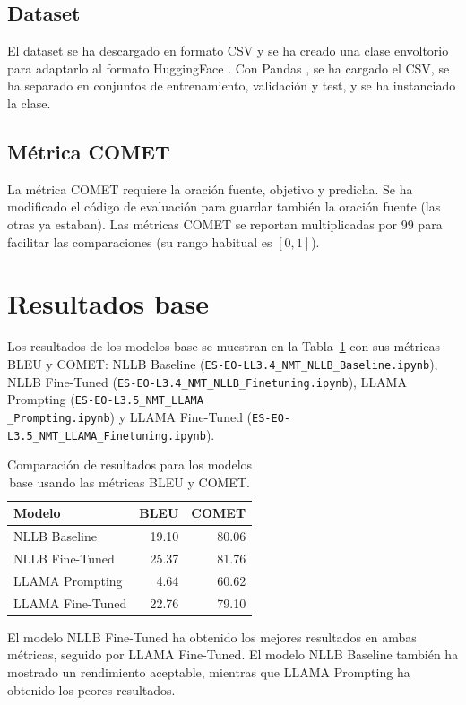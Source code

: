 \documentclass[11pt,spanish,listoffigures,listoftables]{tfgetsinf}
\begin{document}
\subsection{Dataset}
El dataset se ha descargado en formato CSV y se ha creado una clase envoltorio para adaptarlo al formato HuggingFace \cite{huggingface-2025-trl-docs}. Con Pandas \cite{pandas-2025}, se ha cargado el CSV, se ha separado en conjuntos de entrenamiento, validación y test, y se ha instanciado la clase.

\subsection{Métrica COMET}
La métrica COMET requiere la oración fuente, objetivo y predicha. Se ha modificado el código de evaluación para guardar también la oración fuente (las otras ya estaban). \noindent  Las métricas COMET se reportan multiplicadas por 99 para facilitar las comparaciones (su rango habitual es $[0, 1]$).

\section{Resultados base}

Los resultados de los modelos base se muestran en la Tabla~\ref{tab:resultados_base} con sus métricas BLEU y COMET: NLLB Baseline (\texttt{ES-EO-LL3.4\_NMT\_NLLB\_Baseline.ipynb}), NLLB Fine-Tuned (\texttt{ES-EO-L3.4\_NMT\_NLLB\_Finetuning.ipynb}), LLAMA Prompting (\texttt{ES-EO-L3.5\_NMT\_LLAMA\\\_Prompting.ipynb}) y LLAMA Fine-Tuned (\texttt{ES-EO-L3.5\_NMT\_LLAMA\_Finetuning.ipynb}).

\begin{table}[H]
\footnotesize
\centering
\begin{tabular}{lrr}
	\toprule
	\textbf{Modelo} & \textbf{BLEU} & \textbf{COMET} \\
	\midrule
	NLLB Baseline & 19.10 & 80.06 \\
	NLLB Fine-Tuned & 25.37 & 81.76 \\
	LLAMA Prompting & 4.64 & 60.62 \\
	LLAMA Fine-Tuned & 22.76 & 79.10 \\
	\bottomrule
\end{tabular}
\caption{Comparación de resultados para los modelos base usando las métricas BLEU y COMET.}
\label{tab:resultados_base}
\end{table}

\noindent El modelo NLLB Fine-Tuned ha obtenido los mejores resultados en ambas métricas, seguido por LLAMA Fine-Tuned. El modelo NLLB Baseline también ha mostrado un rendimiento aceptable, mientras que LLAMA Prompting ha obtenido los peores resultados.
\end{document}
